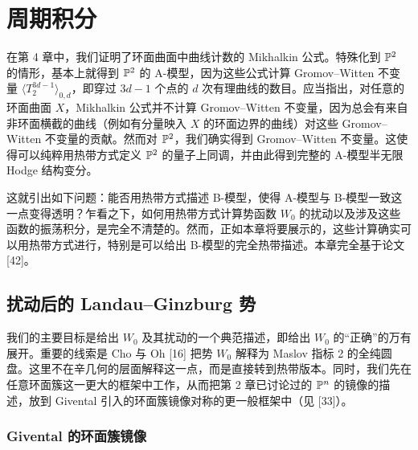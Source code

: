 
\section{周期积分}

在第 4 章中，我们证明了环面曲面中曲线计数的 Mikhalkin 公式。特殊化到 $\mathbb{P}^2$ 的情形，基本上就得到 $\mathbb{P}^2$ 的 A-模型，因为这些公式计算 Gromov--Witten 不变量 $\langle T_2^{3d-1}\rangle_{0,d}$，即穿过 $3d-1$ 个点的 $d$ 次有理曲线的数目。应当指出，对任意的环面曲面 $X$，Mikhalkin 公式并不计算 Gromov--Witten 不变量，因为总会有来自非环面横截的曲线（例如有分量映入 $X$ 的环面边界的曲线）对这些 Gromov--Witten 不变量的贡献。然而对 $\mathbb{P}^2$，我们确实得到 Gromov--Witten 不变量。这使得可以纯粹用热带方式定义 $\mathbb{P}^2$ 的量子上同调，并由此得到完整的 A-模型半无限 Hodge 结构变分。

这就引出如下问题：能否用热带方式描述 B-模型，使得 A-模型与 B-模型一致这一点变得透明？乍看之下，如何用热带方式计算势函数 $W_0$ 的扰动以及涉及这些函数的振荡积分，是完全不清楚的。然而，正如本章将要展示的，这些计算确实可以用热带方式进行，特别是可以给出 B-模型的完全热带描述。本章完全基于论文 [42]。


\subsection{扰动后的 Landau--Ginzburg 势}

我们的主要目标是给出 $W_0$ 及其扰动的一个典范描述，即给出 $W_0$ 的“正确”的万有展开。重要的线索是 Cho 与 Oh [16] 把势 $W_0$ 解释为 Maslov 指标 2 的全纯圆盘。这里不在辛几何的层面解释这一点，而是直接转到热带版本。同时，我们先在任意环面簇这一更大的框架中工作，从而把第 2 章已讨论过的 $\mathbb{P}^n$ 的镜像的描述，放到 Givental 引入的环面簇镜像对称的更一般框架中（见 [33]）。

\subsubsection{Givental 的环面簇镜像}

